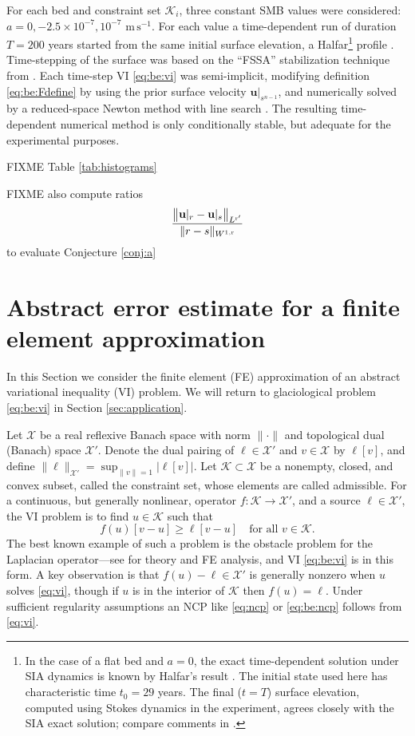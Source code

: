\documentclass[hidelinks,onefignum,onetabnum,final]{siamart220329}  %
\newcommand{\bu}{\mathbf{u}}
\newcommand{\cK}{\mathcal{K}}
\newcommand{\cX}{\mathcal{X}}
\newcommand{\rr}{{\text{\textnormal{r}}}}
\begin{document}
For each bed and constraint set $\cK_i$, three constant SMB values were considered: $a=0,-2.5\times 10^{-7},10^{-7}$ $\text{m}\,\text{s}^{-1}$.  For each value a time-dependent run of duration $T=200$ years started from the same initial surface elevation, a Halfar\footnote{In the case of a flat bed and $a=0$, the exact time-dependent solution under SIA dynamics is known by Halfar's result \cite{Halfar1981}.  The initial state used here has characteristic time $t_0=29$ years.  The final ($t=T$) surface elevation, computed using Stokes dynamics in the experiment, agrees closely with the SIA exact solution; compare comments in \cite{LofgrenAhlkronaHelanow2022}.} profile \cite{Halfar1981}.  Time-stepping of the surface was based on the ``FSSA'' stabilization technique from \cite[equation (23)]{LofgrenAhlkronaHelanow2022}.  Each time-step VI \eqref{eq:be:vi} was semi-implicit, modifying definition \eqref{eq:be:Fdefine} by using the prior surface velocity $\bu|_{s^{n-1}}$, and numerically solved by a reduced-space Newton method with line search \cite{BensonMunson2006}.  The resulting time-dependent numerical method is only conditionally stable, but adequate for the experimental purposes.

FIXME Table \ref{tab:histograms}

FIXME also compute ratios
\begin{equation}
\frac{\big\|\bu|_r - \bu|_s\big\|_{L^{\rr'}}}{\|r-s\|_{W^{1,\rr}}}
\end{equation}
to evaluate Conjecture \ref{conj:a}


\section{Abstract error estimate for a finite element approximation} \label{sec:abstractestimate}

In this Section we consider the finite element (FE) approximation of an abstract variational inequality (VI) problem.  We will return to glaciological problem \eqref{eq:be:vi} in Section \ref{sec:application}.

Let $\cX$ be a real reflexive Banach space with norm $\|\cdot\|$ and topological dual (Banach) space $\cX'$.  Denote the dual pairing of $\ell \in \cX'$ and $v\in\cX$ by $\ell[v]$, and define $\|\ell\|_{\cX'} = \sup_{\|v\|=1} \big|\ell[v]\big|$.  Let $\cK \subset \cX$ be a nonempty, closed, and convex subset, called the constraint set, whose elements are called admissible.  For a continuous, but generally nonlinear, operator $f:\cK \to \cX'$, and a source $\ell\in \cX'$, the VI problem is to find $u\in \cK$ such that
\begin{equation}
f(u)[v-u] \ge \ell[v-u] \quad \text{for all } v\in \cK. \label{eq:vi}
\end{equation}
The best known example of such a problem is the obstacle problem for the Laplacian operator---see \cite{Ciarlet2002,Evans2010,KinderlehrerStampacchia1980} for theory and FE analysis, and VI \eqref{eq:be:vi} is in this form.  A key observation is that $f(u)-\ell \in \cX'$ is generally nonzero when $u$ solves \eqref{eq:vi}, though if $u$ is in the interior of $\cK$ then $f(u)=\ell$.  Under sufficient regularity assumptions an NCP like \eqref{eq:ncp} or \eqref{eq:be:ncp} follows from \eqref{eq:vi}.
\end{document}
